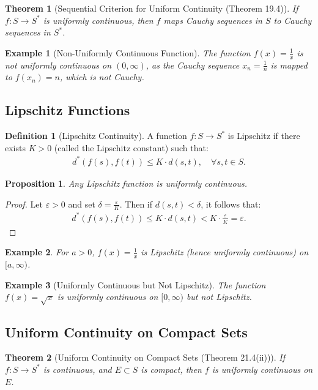\documentclass[9pt]{article}
\theoremstyle{definition}
\newtheorem{definition}{Definition}
\theoremstyle{plain}
\newtheorem{theorem}{Theorem}
\newtheorem{proposition}{Proposition}
\newtheorem{example}{Example}
\begin{document}
\begin{theorem}[Sequential Criterion for Uniform Continuity (Theorem 19.4)]
If $ f : S \to S^* $ is uniformly continuous, then $ f $ maps Cauchy sequences in $ S $ to Cauchy sequences in $ S^* $.
\end{theorem}

\begin{example}[Non-Uniformly Continuous Function]
The function $ f(x) = \frac{1}{x} $ is not uniformly continuous on $ (0, \infty) $, as the Cauchy sequence $ x_n = \frac{1}{n} $ is mapped to $ f(x_n) = n $, which is not Cauchy.
\end{example}

\subsection*{Lipschitz Functions}
\begin{definition}[Lipschitz Continuity]
A function $ f : S \to S^* $ is Lipschitz if there exists $ K > 0 $ (called the Lipschitz constant) such that:
\begin{align}
d^*(f(s), f(t)) \leq K \cdot d(s, t), \quad \forall s, t \in S.
\end{align}
\end{definition}

\begin{proposition}
Any Lipschitz function is uniformly continuous.
\end{proposition}

\begin{proof}
Let $ \varepsilon > 0 $ and set $ \delta = \frac{\varepsilon}{K} $. Then if $ d(s, t) < \delta $, it follows that:
\begin{align}
d^*(f(s), f(t)) \leq K \cdot d(s, t) < K \cdot \frac{\varepsilon}{K} = \varepsilon.
\end{align}
\end{proof}

\begin{example}
For $ a > 0 $, $ f(x) = \frac{1}{x} $ is Lipschitz (hence uniformly continuous) on $ [a, \infty) $.
\end{example}

\begin{example}[Uniformly Continuous but Not Lipschitz]
The function $ f(x) = \sqrt{x} $ is uniformly continuous on $ [0, \infty) $ but not Lipschitz.
\end{example}

\subsection*{Uniform Continuity on Compact Sets}
\begin{theorem}[Uniform Continuity on Compact Sets (Theorem 21.4(ii))]
If $ f : S \to S^* $ is continuous, and $ E \subset S $ is compact, then $ f $ is uniformly continuous on $ E $.
\end{theorem}
\end{document}
